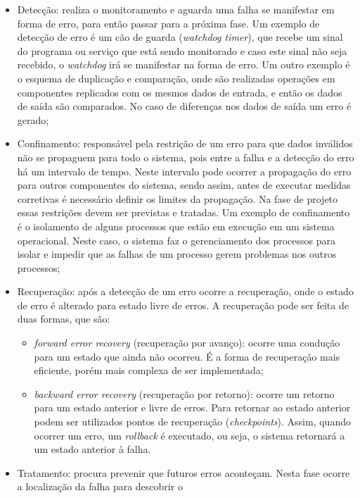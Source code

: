 \begin{itemize}
 \item Detecção: realiza o monitoramento e aguarda uma falha se manifestar em forma de erro, para então passar para a próxima fase. 
 Um exemplo de detecção de erro é um cão de guarda (\textit{watchdog timer}), que recebe um sinal do programa ou serviço que está sendo 
 monitorado e caso este sinal não seja recebido, o \textit{watchdog} irá se manifestar na forma de erro. 
 Um outro exemplo é o esquema de duplicação e comparação, onde são realizadas operações em componentes replicados com os mesmos dados de 
 entrada, e então os dados de saída são comparados. No caso de diferenças nos dados de saída um erro é gerado;
 \item Confinamento: responsável pela restrição de um erro para que dados inválidos não se propaguem para todo o sistema, pois entre a falha e a
 detecção do erro há um intervalo de tempo. Neste intervalo pode ocorrer a propagação do erro para outros componentes do sistema, sendo assim, 
 antes de executar medidas corretivas é necessário definir os limites da propagação. Na fase de projeto essas restrições devem ser previstas
 e tratadas. Um exemplo de confinamento é o isolamento de alguns processos que estão em execução em um sistema operacional. Neste caso, o 
 sistema faz o gerenciamento dos processos para isolar e impedir que as falhas de um processo gerem problemas nos outros processos;
 \item Recuperação: após a detecção de um erro ocorre a recuperação, onde o estado de erro é alterado para estado livre de erros. A recuperação
 pode ser feita de duas formas, que são:
 \begin{itemize}
  \item \textit{forward error recovery} (recuperação por avanço): ocorre uma condução para um estado que ainda não ocorreu. É a forma
  de recuperação mais eficiente, porém mais complexa de ser implementada;
  \item \textit{backward error recovery} (recuperação por retorno): ocorre um retorno para um estado anterior e livre de erros.
  Para retornar ao estado anterior podem ser utilizados pontos de recuperação (\textit{checkpoints}). Assim, quando ocorrer um erro, um 
  \textit{rollback} é executado, ou seja, o sistema retornará a um estado anterior à falha.
 \end{itemize}
 \item Tratamento: procura prevenir que futuros erros aconteçam. Nesta fase ocorre a localização da falha para descobrir o 

\end{itemize}
